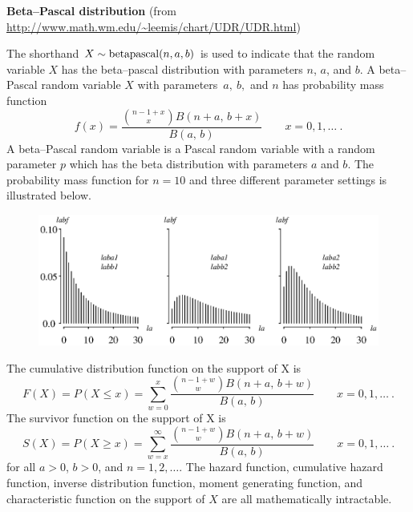 \documentclass[12pt,fullpage]{article}
\begin{document}
\noindent
{\bf Beta--Pascal distribution} (from \color{blue}\url{http://www.math.wm.edu/~leemis/chart/UDR/UDR.html}\color{black})

\noindent
The shorthand $X \sim {\rm betapascal}(n, a, b)$ is used to indicate that the
random variable $X$ has the beta--pascal distribution with parameters $n$, $a$, and $b$.
A beta--Pascal random variable $X$ with parameters~$a,~b,$ and $n$ has probability mass function 
$$
f(x) = \frac {{n-1+x\choose x} B  \left( n+a, \, b+x \right) }{
B \left( a, \, b \right) } \quad \quad x = 0, 1, \ldots \ .
$$
A beta--Pascal random variable is a Pascal random variable with a random parameter $p$ which has the
beta distribution with parameters $a$ and $b$.
The probability mass function for $n=10$ and three different parameter settings is illustrated below. \\

\begin{figure}[h!]
\begin{center}
\includegraphics[width=5.6in]{BetapascalPlot.ps}
\end{center}
\end{figure}

\noindent
The cumulative distribution function on the support of X is
$$
F(X) = P(X \leq x) = \displaystyle \sum_{w=0}^x \frac {{n-1+w\choose w} B  \left( n+a, \, b+w \right) }{
B \left( a, \, b \right) } \quad \quad x = 0, 1, \ldots \ .
$$
The survivor function on the support of X is
$$
S(X) = P(X \geq x) = \displaystyle \sum_{w=x}^\infty \frac {{n-1+w\choose w} B  \left( n+a, \, b+w \right) }{
B \left( a, \, b \right) } \quad \quad x = 0, 1, \ldots \ .
$$
for all $a>0$, $b>0$, and $n= 1, 2, \ldots.$ The hazard function,
cumulative hazard function, inverse distribution function, moment generating function, and characteristic function 
on the support of $X$ are all mathematically intractable.
\end{document}

